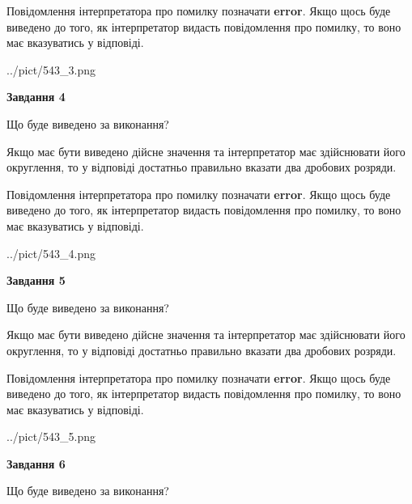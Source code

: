 \documentclass[12pt, ukrainian]{article}
\begin{document}
{\begin {Large}
Повідомлення інтерпретатора про помилку позначати \textbf{error}.
Якщо щось буде виведено до того, як інтерпретатор видасть повідомлення про помилку, 
то воно має вказуватись у відповіді. \par

\begin{center}
	{../pict/543_3.png}
\end{center}
\newpage

{\begin {center}\textbf{Завдання 4}\end {center}}\par
Що буде виведено за виконання? \par

Якщо має бути виведено дійсне значення та інтерпретатор має здійснювати його округлення, 
то у відповіді достатньо правильно вказати два дробових розряди.

Повідомлення інтерпретатора про помилку позначати \textbf{error}.
Якщо щось буде виведено до того, як інтерпретатор видасть повідомлення про помилку, 
то воно має вказуватись у відповіді. \par

\begin{center}
	{../pict/543_4.png}
\end{center}
\newpage

{\begin {center}\textbf{Завдання 5}\end {center}}\par
Що буде виведено за виконання? \par

Якщо має бути виведено дійсне значення та інтерпретатор має здійснювати його округлення, 
то у відповіді достатньо правильно вказати два дробових розряди.

Повідомлення інтерпретатора про помилку позначати \textbf{error}.
Якщо щось буде виведено до того, як інтерпретатор видасть повідомлення про помилку, 
то воно має вказуватись у відповіді. \par

\begin{center}
	{../pict/543_5.png}
\end{center}
\newpage

{\begin {center}\textbf{Завдання 6}\end {center}}\par
Що буде виведено за виконання? \par


\end{Large}}
\end{document}
